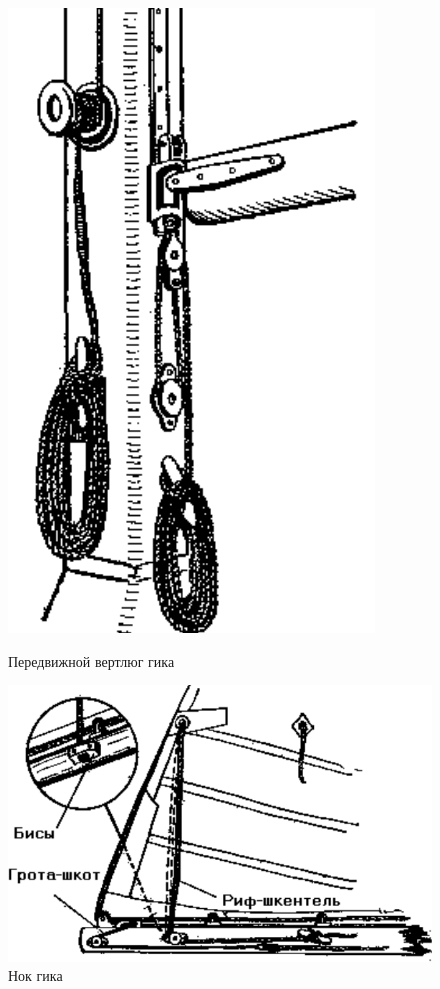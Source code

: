 \documentclass[a4paper, 12pt, twoside, final]{scrbook}
\begin{document}
\begin{figure}[htbp]
	\begin{minipage}[b]{0.49\textwidth}
		\centering\includegraphics[scale=0.9]{Peredvizhnoj_vertljug_gika}
		\caption{Передвижной вертлюг гика}
		\label{fig:41}
	\end{minipage}
	\hfil\hfil%
	\begin{minipage}[b]{0.49\textwidth}
		\centering\includegraphics[scale=0.85]{Nok_gika}
		\caption{Нок гика}
		\label{fig:42}
	\end{minipage}
\end{figure}
\end{document}
